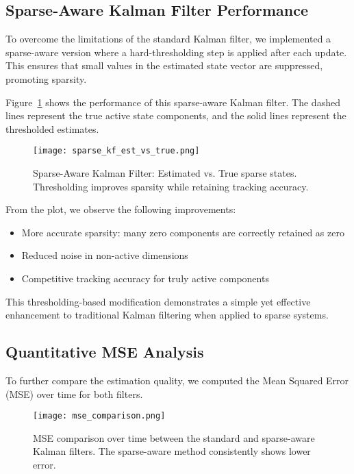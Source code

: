 \documentclass[12pt]{article}
\begin{document}
\subsection{Sparse-Aware Kalman Filter Performance}
To overcome the limitations of the standard Kalman filter, we implemented a sparse-aware version where a hard-thresholding step is applied after each update. This ensures that small values in the estimated state vector are suppressed, promoting sparsity.

Figure~\ref{fig:sparse-kf} shows the performance of this sparse-aware Kalman filter. The dashed lines represent the true active state components, and the solid lines represent the thresholded estimates.

\begin{figure}[h!]
  \centering
  \texttt{[image: sparse\_kf\_est\_vs\_true.png]}
  \caption{Sparse-Aware Kalman Filter: Estimated vs. True sparse states. Thresholding improves sparsity while retaining tracking accuracy.}
  \label{fig:sparse-kf}
\end{figure}

From the plot, we observe the following improvements:
\begin{itemize}
  \item More accurate sparsity: many zero components are correctly retained as zero
  \item Reduced noise in non-active dimensions
  \item Competitive tracking accuracy for truly active components
\end{itemize}

This thresholding-based modification demonstrates a simple yet effective enhancement to traditional Kalman filtering when applied to sparse systems.

\subsection{Quantitative MSE Analysis}
To further compare the estimation quality, we computed the Mean Squared Error (MSE) over time for both filters.

\begin{figure}[h!]
  \centering
  \texttt{[image: mse\_comparison.png]}
  \caption{MSE comparison over time between the standard and sparse-aware Kalman filters. The sparse-aware method consistently shows lower error.}
  \label{fig:mse-over-time}
\end{figure}
\end{document}
